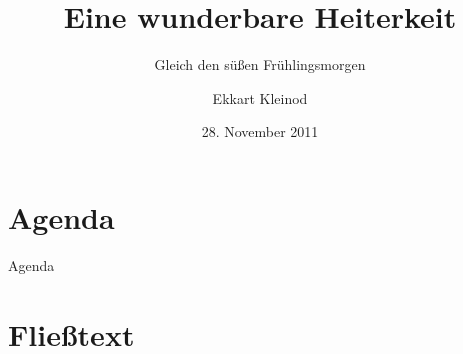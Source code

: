  {



}

\usepackage[ngerman]{babel}
\usepackage{tikz}

\title[Heiterkeit]{Eine wunderbare Heiterkeit}

\subtitle{Gleich den süßen Frühlingsmorgen}

\author{Ekkart Kleinod}
\date{28. November 2011}


\subject{Heiterkeit, Frühlingsmorgen}






	 {
		\maketitle
	}

	\begin{frame}
		\titlepage
	\end{frame}

	\section*{Agenda}

	\begin{frame}{Agenda}
		\tableofcontents[hideallsubsections]
	\end{frame}


	\section{Fließtext}

